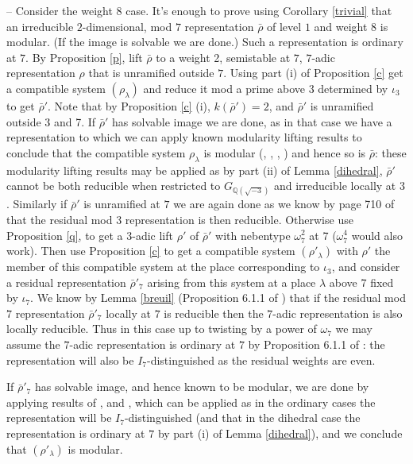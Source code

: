 \documentclass[12pt]{amsart}
\newcommand{\Q}{\mathbb{Q}}
\newcommand{\rhobar}{\overline{\rho}}
\def\rhobar{ {\bar {\rho} } }
\def\rhob{ {\bar {\rho} } }
\begin{document}
-- Consider the
weight 8 case. It's enough to prove using Corollary \ref{trivial}
that an irreducible $2$-dimensional, mod $7$ representation $\rhob$ of level $1$ and
weight $8$ is modular. (If the image is solvable we are done.) Such a representation is ordinary at $7$. By Proposition 
\ref{p}, lift $\rhobar$ to a weight 2,
semistable at $7$, $7$-adic representation $\rho$ that is unramified outside $7$. Using part (i) of 
Proposition \ref{c} get a compatible system $(\rho_\lambda)$ and reduce it mod a prime above 3 determined by $\iota_3$ to get $\rhobar'$. Note that 
by Proposition \ref{c} (i), $k(\rhobar')=2$, and $\rhobar'$ is
unramified outside 3 and 7.  If $\rhobar'$ has solvable image we are done, as in that case we have a representation to which we can apply known 
modularity lifting results to conclude that the compatible system
$\rho_{\lambda}$ is modular (\cite{Wiles}, \cite{TW}, \cite{SW2}, \cite{SW3}) and hence so is $\rhobar$:
these modularity lifting results may be applied
as by part (ii)   of Lemma \ref{dihedral}, $\rhobar'$ cannot be both reducible when restricted
to $G_{\Q(\sqrt{-3})}$ and irreducible locally at $3$. Similarly 
if $\rhobar'$ is unramified at $7$ we are again done
as we know by page 710 of \cite{Serre2} that the residual mod $3$ representation is then reducible.
Otherwise use Proposition 
\ref{q}, to
get a 3-adic lift $\rho'$ of $\rhobar'$ with nebentype $\omega_7^2$ at 7 ($\omega_7^4$ would also work). Then use Proposition
\ref{c} to get a compatible system $(\rho'_{\lambda})$ with $\rho'$ the member of this compatible system at the place corresponding to $\iota_3$, 
and consider a residual representation $\rhob'_7$ arising from this system at a place 
$\lambda$ above 7 fixed by $\iota_7$. We know
by Lemma \ref{breuil} (Proposition 6.1.1 of \cite{BM})
that if the residual mod $7$ representation $\rhob'_7$ locally at $7$ is reducible then the $7$-adic
representation is also locally reducible. Thus in this case up to twisting 
by a power of $\omega_7$ we may
assume the $7$-adic representation is ordinary at $7$ by Proposition 6.1.1 of \cite{BM}: the representation will also be $I_7$-distinguished as the residual weights are even.

If $\rhob'_7$ has solvable image, and hence known to be modular, we are done by applying results of \cite{SW2}, \cite{SW3} and \cite{Kisin}, which can be applied as
in the ordinary cases the representation will be $I_7$-distinguished
(and that in the dihedral case the representation is ordinary at $7$ by part (i) of Lemma \ref{dihedral}), and we conclude that 
$(\rho'_{\lambda})$ is modular.
\end{document}
